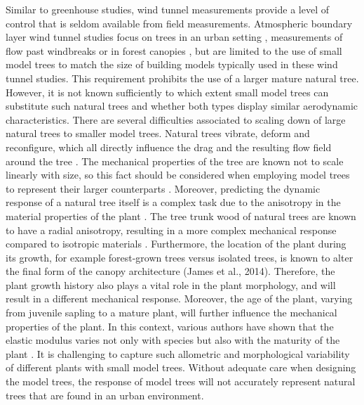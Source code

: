 Similar to greenhouse studies, wind tunnel measurements provide a level of control that is seldom available from field measurements. Atmospheric boundary layer wind tunnel studies focus on trees in an urban setting \citep{Gromke2011,Gromke2008a}, measurements of flow past windbreaks \citep{Guan2003} or in forest canopies \citep{Bai2013,Conan2015,Kinnersley1994}, but are limited to the use of small model trees to match the size of building models typically used in these wind tunnel studies. This requirement prohibits the use of a larger mature natural tree. However, it is not known sufficiently to which extent small model trees can substitute such natural trees and whether both types display similar aerodynamic characteristics. There are several difficulties associated to scaling down of large natural trees to smaller model trees. Natural trees vibrate, deform and reconfigure, which all directly influence the drag and the resulting flow field around the tree \citep{Schouveiler2006,Tadrist2014,Vogel1989}. The mechanical properties of the tree are known not to scale linearly with size, so this fact should be considered when employing model trees to represent their larger counterparts \citep{DeLangre2008}. Moreover, predicting the dynamic response of a natural tree itself is a complex task due to the anisotropy in the material properties of the plant \citep{James2017}. The tree trunk wood of natural trees are known to have a radial anisotropy, resulting in a more complex mechanical response compared to isotropic materials \citep{Albrecht2016}. Furthermore, the location of the plant during its growth, for example forest-grown trees versus isolated trees, is known to alter the final form of the canopy architecture (James et al., 2014). Therefore, the plant growth history also plays a vital role in the plant morphology, and will result in a different mechanical response. Moreover, the age of the plant, varying from juvenile sapling to a mature plant, will further influence the mechanical properties of the plant. In this context, various authors have shown that the elastic modulus varies not only with species but also with the maturity of the plant \citep{Dahle2010,Macdonald2002,Telewski1995,Watt2008,Woodrum2003}. It is challenging to capture such allometric and morphological variability of different plants with small model trees. Without adequate care when designing the model trees, the response of model trees will not accurately represent natural trees that are found in an urban environment.

